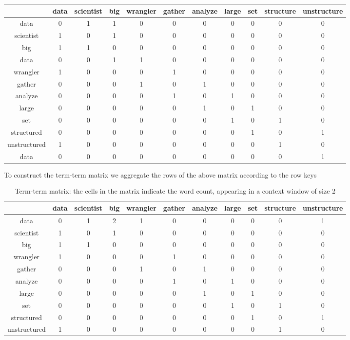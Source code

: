 \documentclass[12pt, oneside]{article}
\begin{document}
\begin{center}
 \begin{tabular}{c c c c c c c c c c c} 
 \hline
   & data &scientist &big &wrangler &gather &analyze &large &set &structure &unstructure\\ [0.5ex] 
 \hline\hline
 data & 0 &1 &1 &0 &0 &0 &0 &0 &0 &0\\ 
 \hline
 scientist & 1 &0 &1 &0 &0 &0 &0 &0 &0 &0\\
 \hline
 big  & 1 &1 &0 &0 &0 &0 &0 &0 &0 &0\\
 \hline
 data& 0 &0 &1 &1 &0 &0 &0 &0 &0 &0\\
 \hline
 wrangler & 1 &0 &0 &0 &1 &0 &0 &0 &0 &0\\
 \hline
 gather& 0 &0 &0 &1 &0 &1 &0 &0 &0 &0\\
 \hline
 analyze& 0 &0 &0 &0 &1 &0 &1 &0 &0 &0\\
 \hline
 large& 0 &0 &0 &0 &0 &1 &0 &1 &0 &0\\
 \hline
 set& 0 &0 &0 &0 &0 &0 &1 &0 &1 &0\\
 \hline
 structured& 0 &0 &0 &0 &0 &0 &0 &1 &0 &1\\
 \hline
 unstructured& 1 &0 &0 &0 &0 &0 &0 &0 &1 &0\\
 \hline 
 data& 0 &0 &0 &0 &0 &0 &0 &0 &0 &1 \\
 \hline
\end{tabular}
\end{center}

To construct the term-term matrix we aggregate the rows of the above matrix according to the row keys

\begin{table}
\caption{Term-term matrix: the cells in the matrix indicate the word count, appearing in a context window of size 2}
 \begin{tabular}{c c c c c c c c c c c} 
 \hline
   & data &scientist &big &wrangler &gather &analyze &large &set &structure &unstructure\\ [0.5ex] 
 \hline\hline
 data & 0 &1 &2 &1 &0 &0 &0 &0 &0 &1\\ 
 \hline
 scientist & 1 &0 &1 &0 &0 &0 &0 &0 &0 &0\\
 \hline
 big  & 1 &1 &0 &0 &0 &0 &0 &0 &0 &0\\
 \hline
 wrangler & 1 &0 &0 &0 &1 &0 &0 &0 &0 &0\\
 \hline
 gather& 0 &0 &0 &1 &0 &1 &0 &0 &0 &0\\
 \hline
 analyze& 0 &0 &0 &0 &1 &0 &1 &0 &0 &0\\
 \hline
 large& 0 &0 &0 &0 &0 &1 &0 &1 &0 &0\\
 \hline
 set& 0 &0 &0 &0 &0 &0 &1 &0 &1 &0\\
 \hline
 structured& 0 &0 &0 &0 &0 &0 &0 &1 &0 &1\\
 \hline
 unstructured& 1 &0 &0 &0 &0 &0 &0 &0 &1 &0\\
 \hline 
 \hline
\end{tabular}
\end{table}
\end{document}
